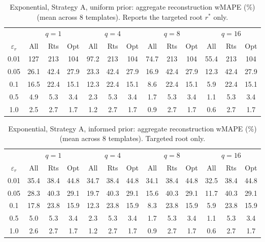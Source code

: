 \begin{table}[h]
\centering
\setlength{\tabcolsep}{2.5pt}
\small
\caption{Exponential, Strategy A, uniform prior: aggregate reconstruction wMAPE (\%) (mean across 8 templates). Reports the targeted root $r^*$ only.}
\label{tab:rq2_exp_A_uniform}
\begin{tabular}{c|ccc|ccc|ccc|ccc}
\toprule
& \multicolumn{3}{c|}{$q=1$} & \multicolumn{3}{c|}{$q=4$} & \multicolumn{3}{c|}{$q=8$} & \multicolumn{3}{c}{$q=16$} \\
$\varepsilon_r$ & All & Rts & Opt & All & Rts & Opt & All & Rts & Opt & All & Rts & Opt \\
\midrule
0.01 & 127  & 213  & 104  & 97.2 & 213  & 104  & 74.7 & 213  & 104  & 55.4 & 213  & 104 \\
0.05 & 26.1 & 42.4 & 27.9 & 23.3 & 42.4 & 27.9 & 16.9 & 42.4 & 27.9 & 12.3 & 42.4 & 27.9 \\
0.1  & 16.5 & 22.4 & 15.1 & 12.3 & 22.4 & 15.1 & 8.6  & 22.4 & 15.1 & 5.9  & 22.4 & 15.1 \\
0.5  & 4.9  & 5.3  & 3.4  & 2.3  & 5.3  & 3.4  & 1.7  & 5.3  & 3.4  & 1.1  & 5.3  & 3.4 \\
1.0  & 2.5  & 2.7  & 1.7  & 1.2  & 2.7  & 1.7  & 0.9  & 2.7  & 1.7  & 0.6  & 2.7  & 1.7 \\
\bottomrule
\end{tabular}
\end{table}

\begin{table}[h]
\centering
\setlength{\tabcolsep}{2.5pt}
\small
\caption{Exponential, Strategy A, informed prior: aggregate reconstruction wMAPE (\%) (mean across 8 templates). Targeted root only.}
\label{tab:rq2_exp_A_informed}
\begin{tabular}{c|ccc|ccc|ccc|ccc}
\toprule
& \multicolumn{3}{c|}{$q=1$} & \multicolumn{3}{c|}{$q=4$} & \multicolumn{3}{c|}{$q=8$} & \multicolumn{3}{c}{$q=16$} \\
$\varepsilon_r$ & All & Rts & Opt & All & Rts & Opt & All & Rts & Opt & All & Rts & Opt \\
\midrule
0.01 & 35.4 & 38.4 & 44.8 & 34.7 & 38.4 & 44.8 & 34.1 & 38.4 & 44.8 & 32.5 & 38.4 & 44.8 \\
0.05 & 28.3 & 40.3 & 29.1 & 19.7 & 40.3 & 29.1 & 15.6 & 40.3 & 29.1 & 11.7 & 40.3 & 29.1 \\
0.1  & 17.8 & 23.8 & 15.9 & 12.3 & 23.8 & 15.9 & 8.3  & 23.8 & 15.9 & 5.9  & 23.8 & 15.9 \\
0.5  & 5.0  & 5.3  & 3.4  & 2.3  & 5.3  & 3.4  & 1.7  & 5.3  & 3.4  & 1.1  & 5.3  & 3.4 \\
1.0  & 2.6  & 2.7  & 1.7  & 1.2  & 2.7  & 1.7  & 0.9  & 2.7  & 1.7  & 0.6  & 2.7  & 1.7 \\
\bottomrule
\end{tabular}
\end{table}

